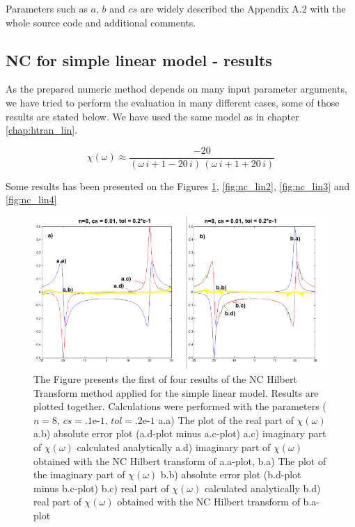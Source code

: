 \documentclass[12pt,twoside,a4paper]{article}
\numberwithin{equation}{subsection}
\numberwithin{figure}{subsection}
\begin{document}
Parameters such as $a$, $b$ and $cs$ are widely described the Appendix A.2 with the whole source code and additional comments.


\subsection{NC for simple linear model - results} \label{chap:nc_lin}

As the prepared numeric method depends on many input parameter arguments, we have tried to perform the evaluation in many different
cases, some of those results are stated below. We have used the same model as in chapter \ref{chap:htran_lin}.

\begin{equation} \label{eq:nc_algoritm}
  \chi (\omega ) \approx \frac { - 20}{(\omega \,i + 1 - 20\,i)\,(\omega \,i + 1 + 20\,i)}
\end{equation} 

Some results has been presented on the Figures \ref{fig:nc_lin1}, \ref{fig:nc_lin2}, \ref{fig:nc_lin3} and \ref{fig:nc_lin4}

\begin{figure}
  \includegraphics[width=150mm]{img/nc_lin1.png}
   \caption{ The Figure presents the first of four results of the NC Hilbert Transform method applied for the simple linear model. Results
   are plotted together. Calculations were performed with the parameters ($n=8, \,c s=\mbox{.1e-1}, \,tol=\mbox{.2e-1}$ 
     a.a) The plot of the real part of $\chi (\omega )$ 
     a.b) absolute error plot (a.d-plot minus a.c-plot) 
     a.c) imaginary part of $\chi (\omega )$ calculated analytically 
     a.d) imaginary part of $\chi (\omega )$ obtained with the NC Hilbert transform of a.a-plot, 
     b.a) The plot of the imaginary part of $\chi (\omega )$ 
     b.b) absolute error plot (b.d-plot minus b.c-plot) 
     b.c) real part of $\chi (\omega )$ calculated analytically 
     b.d) real part of $\chi (\omega )$ obtained with the NC Hilbert transform of b.a-plot 
     \label{fig:nc_lin1}
  }
\end{figure}
\end{document}
